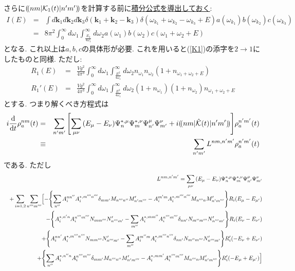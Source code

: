 \documentclass[10.5pt,a4paper]{jreport}
\newcommand{\dpbra}[1]{( \! ( #1 |}
\newcommand{\dpket}[1]{| #1 ) \! )}
\newcommand{\calK}{{\cal K}}
\begin{document}
さらに$\dpbra{nm}\calK_1(t)\dpket{n'm'}$を計算する前に\underline{積分公式を導出しておく}:
\begin{eqnarray}
  I(E) &=& \int d\bm{k}_1d\bm{k}_2d\bm{k}_3\delta(\bm{k}_1+\bm{k}_2-\bm{k}_3)\delta(\omega_{k_1} + \omega_{k_2} - \omega_{k_3} + E)a(\omega_{k_1})b(\omega_{k_2})c(\omega_{k_3})\\
  &=& 8\pi^2\int_0^\infty d\omega_1\int_{\frac{E_2}{4\omega_1}}^\infty d\omega_2 a(\omega_1)b(\omega_2)c(\omega_1 + \omega_2 + E)
\end{eqnarray}
となる. これ以上は$a, b, c$の具体形が必要. これを用いると(\ref{K1})の添字を$2\rightarrow1$にしたものと同様. ただし:
\begin{eqnarray}
  R_1(E) &=& \frac{Vg^2}{4\pi^3}\int_0^\infty d\omega_1\int_{\frac{E^2}{4\omega_1}}^\infty d\omega_2 n_{\omega_1}n_{\omega_2}(1 + n_{\omega_1 + \omega_2 + E})\\
  R_1'(E) &=& \frac{Vg^2}{4\pi^3}\int_0^\infty d\omega_1\int_{\frac{E^2}{4\omega_1}}^\infty d\omega_2 (1 + n_{\omega_1})(1 + n_{\omega_2})n_{\omega_1 + \omega_2 + E}
\end{eqnarray}
とする. つまり解くべき方程式は
\begin{eqnarray}
  i\dv{t}\rho_a^{nm}(t) &=& \sum_{n'm'}\bqty{\sum_{\mu\nu}\pqty{E_\mu - E_\nu}\Psi_{n}^{*, \mu}\Psi_{m}^{*, \nu}\Psi_{n'}^{\mu}\Psi_{m'}^{\nu} + i\dpbra{nm}\hat{\calK}(t)\dpket{n'm'}}\rho_a^{n'm'}(t)\\
  &\equiv& \sum_{n'm'} L^{nm, n'm'}\rho_a^{n'm'}(t)\label{Master2}
\end{eqnarray}
である. ただし
\begin{eqnarray}
  &&L^{nm, n'm'} = \sum_{\mu\nu}\pqty{E_\mu - E_\nu}\Psi_{n}^{*, \mu}\Psi_{m}^{*, \nu}\Psi_{n'}^{\mu}\Psi_{m'}^{\nu} \\
  &&+\sum_{i = 1, 2}\sum_{n'''m'''}\Bigl[\nonumber -\Bqty{\sum_{n''}A_i^{nn''}A_i^{*, m'''n'''}\delta_{mm'}M_{n'''n''}M_{n'm'''}' - A_i^{m'm}A_i^{*, m'''n'''}M_{n'''n}M_{n'm'''}'}R_i(E_\mu - E_{\mu'})\\
    \nonumber &&- \Bqty{A_i^{*, n'n}A_i^{n'''m'''}N_{mm'''}N_{n'''m'}' - \sum_{m''}A_i^{*, mm''}A_i^{n'''m'''}\delta_{nn'}N_{m''m'''}N_{n'''m'}'}R_i(E_\nu - E_{\nu'})\\
    \nonumber &&+ \Bqty{A_i^{nn'}A_i^{*, m'''n'''}N_{mm'''}N_{n'''m'}' - \sum_{m''}A_i^{m''m}A_i^{*, m'''n'''}\delta_{nn'}N_{m''m'''}N_{n'''m'}'}R_i'(-E_\nu + E_{\nu'})\\
   \nonumber&&+\Bqty{\sum_{n''}A_i^{*, n''n}A_i^{n'''m'''}\delta_{mm'}M_{n'''n''}M_{n'm'''}' - A_i^{*, mm'}A_i^{n'''m'''}M_{n'''n}M_{n'm'''}'}R_i'(- E_\mu + E_{\mu'})\Bigr]\\\label{L}
\end{eqnarray}
\end{document}
